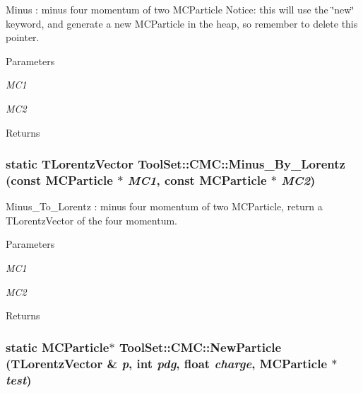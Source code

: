 Minus : minus four momentum of two MCParticle Notice: this will use the \char`\"{}new\char`\"{} keyword, and generate a new MCParticle in the heap, so remember to delete this pointer. 
\begin{DoxyParams}{Parameters}
\item[{\em MC1}]\item[{\em MC2}]\end{DoxyParams}
\begin{DoxyReturn}{Returns}

\end{DoxyReturn}
\hypertarget{classToolSet_1_1CMC_a5883ceda367cc5e32cbacdabdc119a4a}{
\subsubsection[{Minus\_\-By\_\-Lorentz}]{\setlength{\rightskip}{0pt plus 5cm}static TLorentzVector ToolSet::CMC::Minus\_\-By\_\-Lorentz (const MCParticle $\ast$ {\em MC1}, \/  const MCParticle $\ast$ {\em MC2})}}
\label{classToolSet_1_1CMC_a5883ceda367cc5e32cbacdabdc119a4a}


Minus\_\-To\_\-Lorentz : minus four momentum of two MCParticle, return a TLorentzVector of the four momentum. 
\begin{DoxyParams}{Parameters}
\item[{\em MC1}]\item[{\em MC2}]\end{DoxyParams}
\begin{DoxyReturn}{Returns}

\end{DoxyReturn}
\hypertarget{classToolSet_1_1CMC_af2758c1110b4a2d0708a62465a1ad82d}{
\subsubsection[{NewParticle}]{\setlength{\rightskip}{0pt plus 5cm}static MCParticle$\ast$ ToolSet::CMC::NewParticle (TLorentzVector \& {\em p}, \/  int {\em pdg}, \/  float {\em charge}, \/  MCParticle $\ast$ {\em test})}}
\label{classToolSet_1_1CMC_af2758c1110b4a2d0708a62465a1ad82d}


